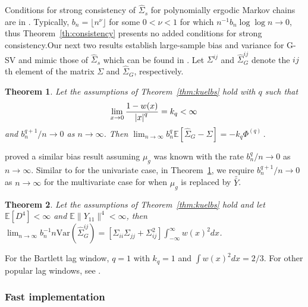 \documentclass[11pt]{article}
\newcommand{\E}{\mathbb{E}}
\newcommand{\Var}{\text{Var}}
\newtheorem{theorem}{Theorem}
\theoremstyle{remark}
\begin{document}
Conditions for strong consistency of $\hat{\Sigma}_s$ for polynomially ergodic Markov chains are in \cite{vats:fleg:jon:2018}. Typically, $b_n = \lfloor n^{\nu} \rfloor$ for some $0< \nu <1$ for which $n^{-1} b_n \log \log n \to 0$, thus Theorem~\ref{th:consistency} presents no added conditions for strong consistency.Our next two results establish large-sample bias and variance for G-SV and mimic those of $\hat{\Sigma}_s$ which can be found in \cite{hannan:1970}. Let $\Sigma^{ij}$ and $\hat{\Sigma}_G^{ij}$ denote the $ij$th element of the matrix $\Sigma$ and $\hat{\Sigma}_G$, respectively.

\begin{theorem}\label{th:G-SVE_bias}
Let the assumptions of Theorem~\ref{thm:kuelbs} hold with $q$ such that 
\[
\lim _{x \to 0} \dfrac{1 - w(x)}{\abs{x}^q} = k_q < \infty\,
\] 
and $b_n^{q+1}/n \to 0$ as $n \to \infty$. Then $ \lim_{n \to \infty}b_n^q\mathbb{E} \left[\hat{\Sigma}_{G} - \Sigma \right] = -k_q\Phi^{(q)}\,.$
\end{theorem}
\cite{hannan:1970} proved a similar bias result assuming $\mu_g$ was known with the rate $b_n^q/n \to 0$ as $n \to \infty$. Similar to \cite{ande:1971} for the univariate case, in Theorem~\ref{th:G-SVE_bias}, we require $b_n^{q+1}/n \to 0$ as $n\to \infty$ for the multivariate case for when $\mu_g$ is replaced by $\bar{\bar{Y}}$. 

\begin{theorem} \label{th:G-SVE_variance}
 Let the assumptions of Theorem~\ref{thm:kuelbs} hold and let $\E[D^4] < \infty$  and  $\E \|Y_{11}\|^4 < \infty$, then $ \lim_{n \to \infty} b_n^{-1}{n}\Var \left(\hat{\Sigma}_{G}^{ij} \right) = [\Sigma_{ii}\Sigma_{jj} + \Sigma_{ij}^2]\int_{-\infty}^{\infty}w(x)^2dx $.
\end{theorem}
For the Bartlett lag window, $q = 1$ with $k_q = 1$ and $\int w(x)^2 dx = 2/3$. For other popular lag windows, see \cite{ande:1971}.

\subsubsection{Fast implementation} %
\label{ssub:fast_implementation}
\end{document}
